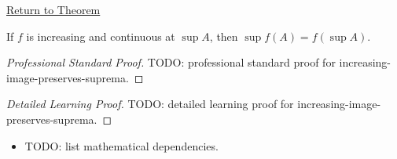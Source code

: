 \newpage
{}
\label{prf:increasing-image-preserves-suprema}

\begin{remark*}[Return]
\hyperref[thm:increasing-image-preserves-suprema]{Return to Theorem}
\end{remark*}

\begin{theorem*}
If $f$ is increasing and continuous at $\sup A$, then
$\sup f(A)=f(\sup A)$.
\end{theorem*}

\begin{proof}[Professional Standard Proof]
\LRAProofBodyStart
TODO: professional standard proof for increasing-image-preserves-suprema.
\end{proof}

\begin{proof}[Detailed Learning Proof]
\LRAProofBodyStart
TODO: detailed learning proof for increasing-image-preserves-suprema.
\end{proof}

\begin{remark*}
\end{remark*}

\begin{dependencies}
\begin{itemize}
  \item TODO: list mathematical dependencies.
\end{itemize}
\end{dependencies}

\clearpage
